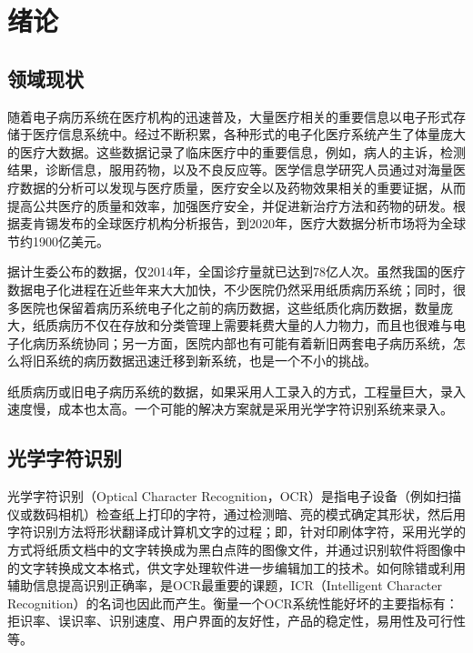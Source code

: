 ﻿\chapter{绪论}
\label{chap:introduction}

\section{领域现状}
随着电子病历系统在医疗机构的迅速普及，大量医疗相关的重要信息以电子形式存储于医疗信息系统中。经过不断积累，各种形式的电子化医疗系统产生了体量庞大的医疗大数据。这些数据记录了临床医疗中的重要信息，例如，病人的主诉，检测结果，诊断信息，服用药物，以及不良反应等。医学信息学研究人员通过对海量医疗数据的分析可以发现与医疗质量，医疗安全以及药物效果相关的重要证据，从而提高公共医疗的质量和效率，加强医疗安全，并促进新治疗方法和药物的研发。根据麦肯锡发布的全球医疗机构分析报告，到2020年，医疗大数据分析市场将为全球节约1900亿美元。%

据计生委公布的数据，仅2014年，全国诊疗量就已达到78亿人次。虽然我国的医疗数据电子化进程在近些年来大大加快，不少医院仍然采用纸质病历系统；同时，很多医院也保留着病历系统电子化之前的病历数据，这些纸质化病历数据，数量庞大，纸质病历不仅在存放和分类管理上需要耗费大量的人力物力，而且也很难与电子化病历系统协同；另一方面，医院内部也有可能有着新旧两套电子病历系统，怎么将旧系统的病历数据迅速迁移到新系统，也是一个不小的挑战。

纸质病历或旧电子病历系统的数据，如果采用人工录入的方式，工程量巨大，录入速度慢，成本也太高。一个可能的解决方案就是采用光学字符识别系统来录入。

\section{光学字符识别}
光学字符识别（Optical Character Recognition，OCR）是指电子设备（例如扫描仪或数码相机）检查纸上打印的字符，通过检测暗、亮的模式确定其形状，然后用字符识别方法将形状翻译成计算机文字的过程；即，针对印刷体字符，采用光学的方式将纸质文档中的文字转换成为黑白点阵的图像文件，并通过识别软件将图像中的文字转换成文本格式，供文字处理软件进一步编辑加工的技术。如何除错或利用辅助信息提高识别正确率，是OCR最重要的课题，ICR（Intelligent Character Recognition）的名词也因此而产生。衡量一个OCR系统性能好坏的主要指标有：拒识率、误识率、识别速度、用户界面的友好性，产品的稳定性，易用性及可行性等。%


